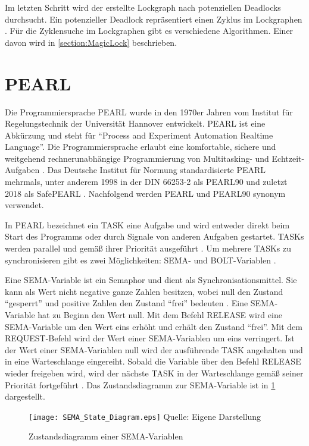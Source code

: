 Im letzten Schritt wird der erstellte Lockgraph nach potenziellen Deadlocks
durchsucht. Ein potenzieller Deadlock repräsentiert einen Zyklus im Lockgraphen
\cites[vgl.][72]{coffman1971system}. Für die Zyklensuche im Lockgraphen gibt es
verschiedene Algorithmen. Einer davon wird in \cref{section:MagicLock}
beschrieben.

\section{PEARL}
\label{section:PEARL}
Die Programmiersprache PEARL wurde in den 1970er Jahren vom Institut für
Regelungstechnik der Universität Hannover entwickelt. PEARL ist eine Abkürzung
und steht für "`Process and Experiment Automation Realtime Language"'. Die
Programmiersprache erlaubt eine komfortable, sichere und weitgehend
rechnerunabhängige Programmierung von Multitasking- und Echtzeit-Aufgaben
\autocite{PEARLHistory}. Das Deutsche Institut für Normung standardisierte PEARL
mehrmals, unter anderem 1998 in der DIN 66253-2 als PEARL90
\autocite{DIN-66253-2:1998-04} und zuletzt 2018 als SafePEARL
\autocite{DIN-66253:2018-03}. Nachfolgend werden PEARL und PEARL90 synonym
verwendet.

In PEARL bezeichnet ein \textrm{TASK} eine Aufgabe und wird entweder direkt beim
Start des Programms oder durch Signale von anderen Aufgaben gestartet.
\textrm{TASKs} werden parallel und gemäß ihrer Priorität ausgeführt
\autocite[vgl.][104]{PEARL}. Um mehrere \textrm{TASKs} zu synchronisieren gibt
es zwei Möglichkeiten: \textrm{SEMA}- und \textrm{BOLT}-Variablen
\autocite[vgl.][120]{PEARL}.

Eine \textrm{SEMA}-Variable ist ein Semaphor und dient als
Synchronisationsmittel. Sie kann als Wert nicht negative ganze Zahlen besitzen,
wobei null den Zustand "`gesperrt"' und positive Zahlen den Zustand "`frei"'
bedeuten \autocite[vgl.][120]{PEARL}. Eine \textrm{SEMA}-Variable hat zu Beginn
den Wert null. Mit dem Befehl \textrm{RELEASE} wird eine \textrm{SEMA}-Variable
um den Wert eins erhöht und erhält den Zustand "`frei"'. Mit dem
\textrm{REQUEST}-Befehl wird der Wert einer \textrm{SEMA}-Variablen um eins
verringert. Ist der Wert einer \textrm{SEMA}-Variablen null wird der ausführende
\textrm{TASK} angehalten und in eine Warteschlange eingereiht. Sobald die
Variable über den Befehl \textrm{RELEASE} wieder freigeben wird, wird der
nächste \textrm{TASK} in der Warteschlange gemäß seiner Priorität fortgeführt
\autocite[vgl.][120-121]{PEARL}. Das Zustandsdiagramm zur \textrm{SEMA}-Variable
ist in \cref{fig:SEMA_StateDiagram} dargestellt.
\begin{figure}[ht]
  \texttt{[image: SEMA\_State\_Diagram.eps]}
  \footnotesize\sffamily Quelle: Eigene Darstellung
  \caption{Zustandsdiagramm einer SEMA-Variablen}
  \label{fig:SEMA_StateDiagram}
\end{figure}

